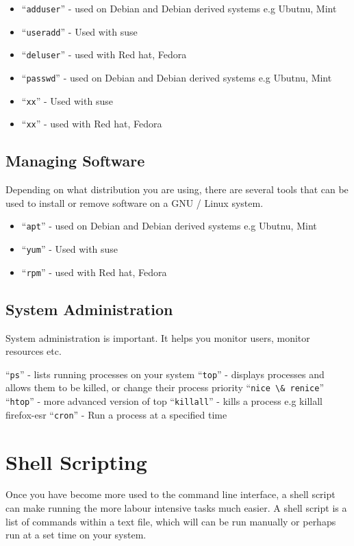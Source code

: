 \documentclass{extbook}
\begin{document}
\begin{itemize}
\item ``\verb|adduser|'' - used on Debian and Debian derived systems e.g Ubutnu, Mint
\item ``\verb|useradd|'' - Used with suse 
\item ``\verb|deluser|'' - used with Red hat, Fedora 
\item ``\verb|passwd|'' - used on Debian and Debian derived systems e.g Ubutnu, Mint
\item ``\verb|xx|'' - Used with suse 
\item ``\verb|xx|'' - used with Red hat, Fedora 
\end{itemize}


\subsection{Managing Software}

Depending on what distribution you are using, there are several tools that can be used to install or remove software on a GNU / Linux system.  

\begin{itemize}
\item ``\verb|apt|'' - used on Debian and Debian derived systems e.g Ubutnu, Mint
\item ``\verb|yum|'' - Used with suse 
\item ``\verb|rpm|'' - used with Red hat, Fedora 
\end{itemize}

\subsection{System Administration}

System administration is important.  It helps you monitor users, monitor resources etc.
\begin{itemize}
``\verb|ps|'' - lists running processes on your system
``\verb|top|'' - displays processes and allows them to be killed, or change their process priority
``\verb|nice \& renice|''
``\verb|htop|'' - more advanced version of top
``\verb|killall|'' - kills a process e.g killall firefox-esr
``\verb|cron|'' - Run a process at a specified time
\end{itemize}

\section{Shell Scripting}

Once you have become more used to the command line interface, a shell script can make running the more labour intensive tasks much easier.  A shell script is a list of commands within a text file, which will can be run manually or perhaps run at a set time on your system.
\end{document}
